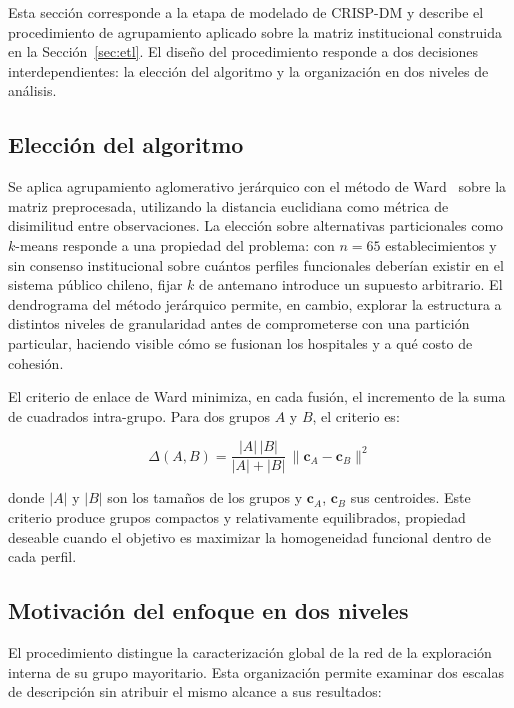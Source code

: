 Esta sección corresponde a la etapa de modelado de CRISP-DM y describe el
procedimiento de agrupamiento aplicado sobre la matriz institucional construida
en la Sección~\ref{sec:etl}. El diseño del procedimiento responde a dos
decisiones interdependientes: la elección del algoritmo y la organización en dos
niveles de análisis.


\subsection{Elección del algoritmo}
\label{sec:algoritmo}


Se aplica agrupamiento aglomerativo jerárquico con el método de Ward~\citep{Ward1963} sobre
la matriz preprocesada, utilizando la distancia euclidiana como métrica
de disimilitud entre observaciones.
La elección sobre alternativas particionales como
$k$-means responde a una propiedad del problema: con $n = 65$ establecimientos y
sin consenso institucional sobre cuántos perfiles funcionales deberían existir
en el sistema público chileno, fijar $k$ de antemano introduce un supuesto
arbitrario. El dendrograma del método jerárquico permite, en cambio, explorar
la estructura a distintos niveles de granularidad antes de comprometerse con una
partición particular, haciendo visible cómo se fusionan los hospitales y a qué
costo de cohesión.

El criterio de enlace de Ward minimiza, en cada fusión, el incremento de la suma
de cuadrados intra-grupo. Para dos grupos $A$ y $B$, el criterio es:

\begin{equation}
  \Delta(A, B) = \frac{|A|\,|B|}{|A| + |B|}
                 \,\lVert \mathbf{c}_A - \mathbf{c}_B \rVert^2
  \label{eq:ward}
\end{equation}

donde $|A|$ y $|B|$ son los tamaños de los grupos y $\mathbf{c}_A$,
$\mathbf{c}_B$ sus centroides. Este criterio produce grupos compactos y
relativamente equilibrados, propiedad deseable cuando el objetivo es maximizar
la homogeneidad funcional dentro de cada perfil.


\subsection{Motivación del enfoque en dos niveles}
\label{sec:motivacion-jerarquico}

El procedimiento distingue la caracterización global de la red de la
exploración interna de su grupo mayoritario. Esta organización permite examinar
dos escalas de descripción sin atribuir el mismo alcance a sus resultados:

